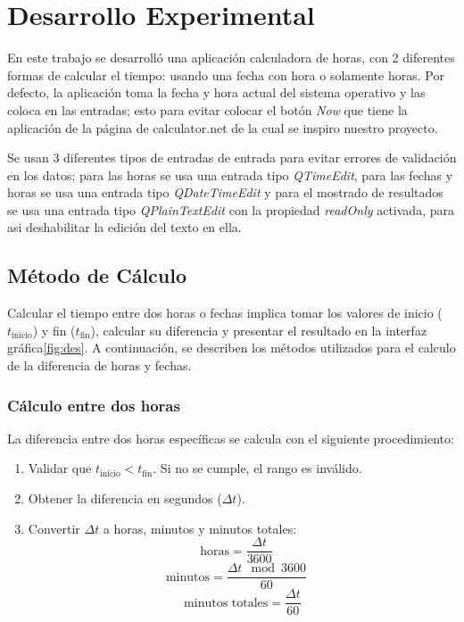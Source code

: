 \documentclass[conference]{IEEEtran}
\begin{document}
\section{Desarrollo Experimental}
    En este trabajo se desarrolló una aplicación calculadora de horas, con 2 diferentes formas de calcular el tiempo: usando una fecha con hora o solamente horas. Por defecto, la aplicación toma la fecha y hora actual del sistema operativo y las coloca en las entradas; esto para evitar colocar el botón \textit{Now} que tiene la aplicación de la página de calculator.net\cite{calculator} de la cual se inspiro nuestro proyecto.

    Se usan 3 diferentes tipos de entradas de entrada para evitar errores de validación en los datos; para las horas se usa una entrada tipo \textit{QTimeEdit}, para las fechas y horas se usa una entrada tipo \textit{QDateTimeEdit} y para el mostrado de resultados se usa una entrada tipo \textit{QPlainTextEdit} con la propiedad \textit{readOnly} activada, para asi deshabilitar la edición del texto en ella.

    \subsection{Método de Cálculo}
        Calcular el tiempo entre dos horas o fechas implica tomar los valores de inicio (\( t_{\text{inicio}} \)) y fin (\( t_{\text{fin}} \)), calcular su diferencia y presentar el resultado en la interfaz gráfica\ref{fig:des}. A continuación, se describen los métodos utilizados para el calculo de la diferencia de horas y fechas.

    \subsubsection{Cálculo entre dos horas}
        La diferencia entre dos horas específicas se calcula con el siguiente procedimiento:

        \begin{enumerate}
            \item Validar que \( t_{\text{inicio}} < t_{\text{fin}} \). Si no se cumple, el rango es inválido.
            \item Obtener la diferencia en segundos (\( \Delta t \)).
            \item Convertir \( \Delta t \) a horas, minutos y minutos totales:
            \[
                \text{horas} = \frac{\Delta t}{3600} \quad 
            \]
            \[
                \text{minutos} = \frac{\Delta t \mod 3600}{60} \quad 
            \]
            \[
                \text{minutos totales} = \frac{\Delta t}{60}
            \]
        \end{enumerate}
\end{document}
